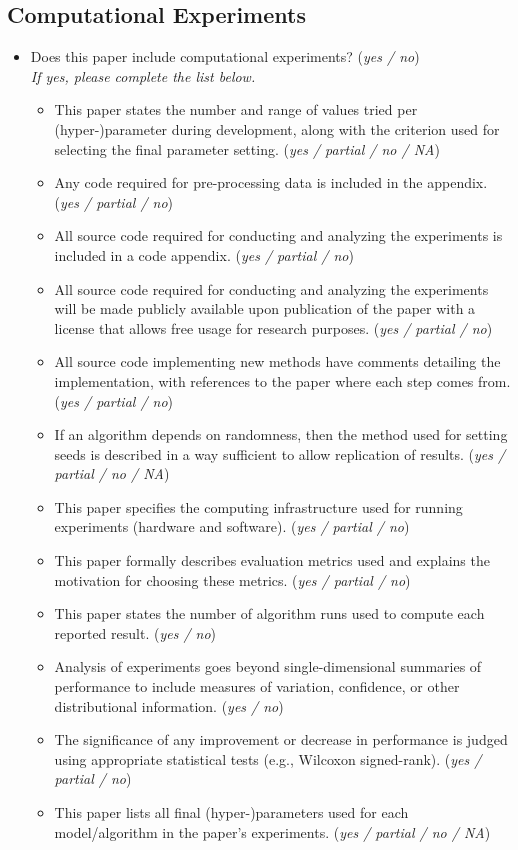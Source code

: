 \documentclass[letterpaper]{article} %
\begin{document}
\subsection*{Computational Experiments}
\begin{itemize}
    \item Does this paper include computational experiments? \hfill (\textit{yes / no}) \\
    \textit{If yes, please complete the list below.}
    \begin{itemize}
        \item This paper states the number and range of values tried per (hyper-)parameter during development, along with the criterion used for selecting the final parameter setting. \hfill (\textit{yes / partial / no / NA})
        \item Any code required for pre-processing data is included in the appendix. \hfill (\textit{yes / partial / no})
        \item All source code required for conducting and analyzing the experiments is included in a code appendix. \hfill (\textit{yes / partial / no})
        \item All source code required for conducting and analyzing the experiments will be made publicly available upon publication of the paper with a license that allows free usage for research purposes. \hfill (\textit{yes / partial / no})
        \item All source code implementing new methods have comments detailing the implementation, with references to the paper where each step comes from. \hfill (\textit{yes / partial / no})
        \item If an algorithm depends on randomness, then the method used for setting seeds is described in a way sufficient to allow replication of results. \hfill (\textit{yes / partial / no / NA})
        \item This paper specifies the computing infrastructure used for running experiments (hardware and software). \hfill (\textit{yes / partial / no})
        \item This paper formally describes evaluation metrics used and explains the motivation for choosing these metrics. \hfill (\textit{yes / partial / no})
        \item This paper states the number of algorithm runs used to compute each reported result. \hfill (\textit{yes / no})
        \item Analysis of experiments goes beyond single-dimensional summaries of performance to include measures of variation, confidence, or other distributional information. \hfill (\textit{yes / no})
        \item The significance of any improvement or decrease in performance is judged using appropriate statistical tests (e.g., Wilcoxon signed-rank). \hfill (\textit{yes / partial / no})
        \item This paper lists all final (hyper-)parameters used for each model/algorithm in the paper’s experiments. \hfill (\textit{yes / partial / no / NA})
    \end{itemize}
\end{itemize}
\end{document}
